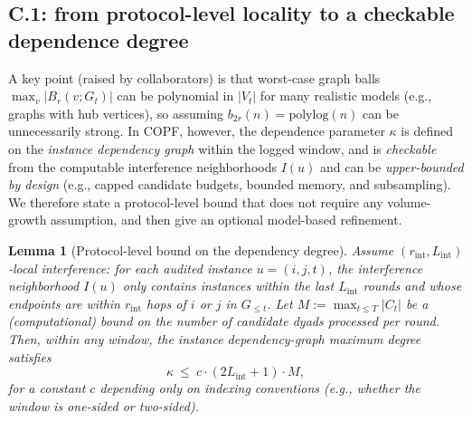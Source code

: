 \documentclass[11pt]{article}
\newcommand{\1}{\mathbf{1}}
\newcommand{\polylog}{\mathrm{polylog}}
\theoremstyle{plain}
\newtheorem{lemma}[theorem]{Lemma}
\theoremstyle{definition}
\theoremstyle{remark}
\begin{document}
\subsection{C.1: from protocol-level locality to a checkable dependence degree}\label{subsec:C1}
A key point (raised by collaborators) is that worst-case graph balls
$\max_{v}|B_r(v;G_t)|$ can be polynomial in $|V_t|$ for many realistic models
(e.g., graphs with hub vertices), so assuming $b_{2r}(n)=\polylog(n)$ can be
unnecessarily strong.  In COPF, however, the dependence parameter $\kappa$
is defined on the \emph{instance dependency graph} within the logged window,
and is \emph{checkable} from the computable interference neighborhoods
$I(u)$ and can be \emph{upper-bounded by design} (e.g., capped candidate budgets,
bounded memory, and subsampling).  We therefore state a protocol-level bound
that does not require any volume-growth assumption, and then give an optional
model-based refinement.

\begin{lemma}[Protocol-level bound on the dependency degree]\label{lem:kappa_protocol}
Assume $(r_{\mathrm{int}},L_{\mathrm{int}})$-local interference: for each audited instance
$u=(i,j,t)$, the interference neighborhood $I(u)$ only contains instances within the
last $L_{\mathrm{int}}$ rounds and whose endpoints are within $r_{\mathrm{int}}$ hops of $i$ or $j$ in $G_{\le t}$.
Let $M:=\max_{t\le T}|C_t|$ be a (computational) bound on the number of candidate dyads processed per round.
Then, within any window, the instance dependency-graph maximum degree satisfies
\[
\kappa \ \le\ c\cdot (2L_{\mathrm{int}}+1)\cdot M ,
\]
for a constant $c$ depending only on indexing conventions (e.g., whether the window is one-sided or two-sided).
\end{lemma}
\end{document}
